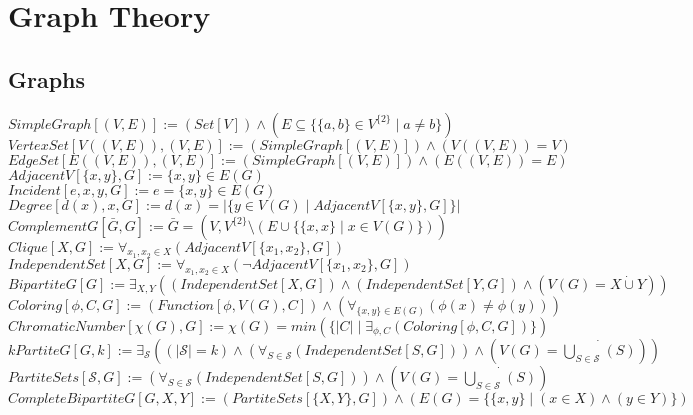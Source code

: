 \documentclass{book}
\newcommand{\abr}{:=}
\newcommand{\pr}[1]{\left(#1\right)}
\newcommand{\setbackgroundcolour}{\pagecolor[rgb]{0.2,0.2,0.2}}
\newcommand{\settextcolour}{\color[rgb]{0.8,0.8,0.8}}
\newcommand{\invertbackgroundtext}{\setbackgroundcolour\settextcolour}
\newcommand{\st}{\mathbin{|}}
\newcommand{\utup}[1]{\{#1\}}
\newcommand{\notation}[2]{\fbox{{[Notation] \phantom{-} $#1 \abr #2$}}}
\begin{document}
\invertbackgroundtext
\setlength{\parindent}{0pt}

\tableofcontents

\chapter{Graph Theory}

\section{Graphs}
$SimpleGraph[(V, E)] \abr (Set[V]) \land (E \subseteq \{\utup{a, b} \in V^{\{2\}} \st a \neq b\})$ \\
$VertexSet[V\pr{(V, E)}, (V, E)] \abr \pr{SimpleGraph[(V, E)]} \land \pr{V\pr{(V, E)} = V}$ \\
$EdgeSet[E\pr{(V, E)}, (V, E)] \abr \pr{SimpleGraph[(V, E)]} \land \pr{E\pr{(V, E)} = E}$ \\
$AdjacentV[\utup{x, y}, G] \abr \utup{x, y} \in E(G)$ \\ %
$Incident[e, x, y, G] \abr e = \utup{x, y} \in E(G)$ \\
$Degree[d(x), x, G] \abr d(x) = |\{y \in V(G) \st AdjacentV[\utup{x, y}, G]\}|$ \\

$ComplementG[\bar{G}, G] \abr \bar{G} = \pr{V, V^{\{2\}} \setminus \pr{E \cup \{\utup{x, x} \st x \in V(G)\}}}$ \\
$Clique[X, G] \abr \forall_{x_1, x_2 \in X}(AdjacentV[\utup{x_1, x_2}, G])$ \\
$IndependentSet[X, G] \abr \forall_{x_1, x_2 \in X}(\lnot AdjacentV[\utup{x_1, x_2}, G])$ \\
$BipartiteG[G] \abr \exists_{X, Y}\pr{(IndependentSet[X, G]) \land (IndependentSet[Y, G]) \land \pr{V(G) = X \dot{\cup} Y}}$ \\
$Coloring[\phi, C, G] \abr \pr{Function[\phi, V(G), C]} \land \pr{\forall_{\utup{x, y} \in E(G)}\pr{\phi(x) \neq \phi(y)}}$ \\
$ChromaticNumber[\chi(G), G] \abr \chi(G) = min\pr{\{|C| \st \exists_{\phi, C}(Coloring[\phi, C, G])\}}$ \\
$kPartiteG[G, k] \abr \exists_{\mathcal{S}}\pr{(|\mathcal{S}| = k) \land \pr{\forall_{S \in \mathcal{S}}(IndependentSet[S, G])} \land \pr{V(G) = \dot{\bigcup \limits_{S \in \mathcal{S}}^{}}(S)}}$ \\
$PartiteSets[\mathcal{S}, G] \abr \pr{\forall_{S \in \mathcal{S}}(IndependentSet[S, G])} \land \pr{V(G) = \dot{\bigcup \limits_{S \in \mathcal{S}}^{}}(S)}$ \\
$CompleteBipartiteG[G, X, Y] \abr (PartiteSets[\{X, Y\}, G]) \land \pr{E(G) = \{\utup{x, y} \st (x \in X) \land (y \in Y)\}}$ \\
\end{document}
